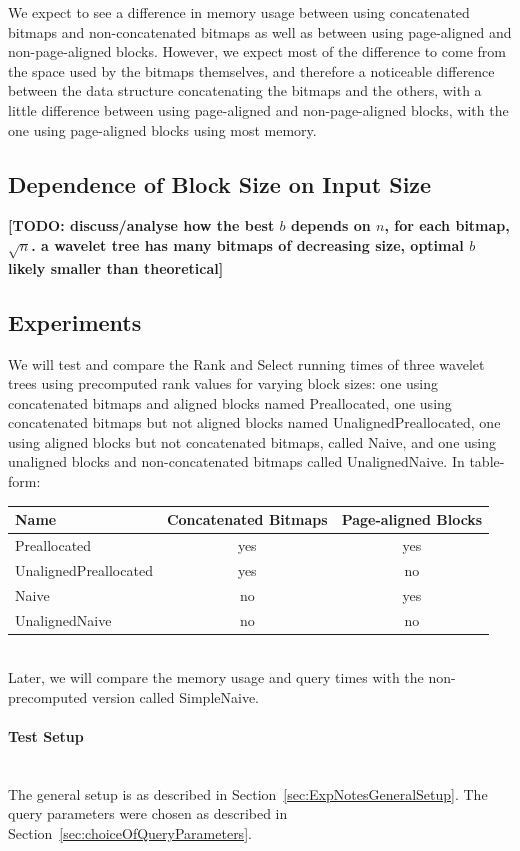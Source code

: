 We expect to see a difference in memory usage between using concatenated bitmaps and non-concatenated bitmaps as well as between using page-aligned and non-page-aligned blocks.
However, we expect most of the difference to come from the space used by the bitmaps themselves, and therefore a noticeable difference between the data structure concatenating the bitmaps and the others, with a little difference between using page-aligned and non-page-aligned blocks, with the one using page-aligned blocks using most memory.


\subsection{Dependence of Block Size on Input Size}
\textbf{[TODO: discuss/analyse how the best $b$ depends on $n$, for each bitmap, $\sqrt{n}$. a wavelet tree has many bitmaps of decreasing size, optimal $b$ likely smaller than theoretical]}


\subsection{Experiments}
We will test and compare the Rank and Select running times of three wavelet trees using precomputed rank values for varying block sizes: one using concatenated bitmaps and aligned blocks named Preallocated, one using concatenated bitmaps but not aligned blocks named UnalignedPreallocated, one using aligned blocks but not concatenated bitmaps, called Naive,
and one using unaligned blocks and non-concatenated bitmaps called UnalignedNaive.
In table-form:\\
\begin{tabular}{|lcc|}
\hline
Name						& Concatenated Bitmaps	& Page-aligned Blocks	\\ \hline
Preallocated				& yes					& yes					\\ \hline
UnalignedPreallocated	& yes					& no						\\ \hline
Naive					& no						& yes					\\ \hline
UnalignedNaive			& no						& no						\\ \hline
\end{tabular}\\

\noindent Later, we will compare the memory usage and query times with the non-precomputed version called SimpleNaive.

\paragraph{Test Setup}~\\
The general setup is as described in Section~\ref{sec:ExpNotesGeneralSetup}.
The query parameters were chosen as described in Section~\ref{sec:choiceOfQueryParameters}.

